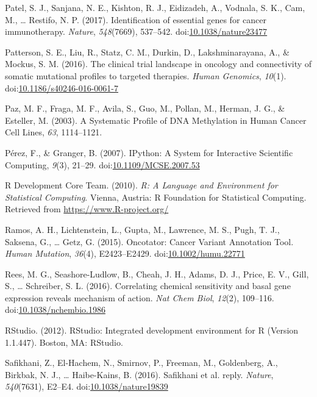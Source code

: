 \documentclass[man,floatsintext]{apa6}
\begin{document}
\hypertarget{ref-patel2017}{}
Patel, S. J., Sanjana, N. E., Kishton, R. J., Eidizadeh, A., Vodnala, S.
K., Cam, M., \ldots{} Restifo, N. P. (2017). Identification of essential
genes for cancer immunotherapy. \emph{Nature}, \emph{548}(7669),
537--542.
doi:\href{https://doi.org/10.1038/nature23477}{10.1038/nature23477}

\hypertarget{ref-patterson2016}{}
Patterson, S. E., Liu, R., Statz, C. M., Durkin, D., Lakshminarayana,
A., \& Mockus, S. M. (2016). The clinical trial landscape in oncology
and connectivity of somatic mutational profiles to targeted therapies.
\emph{Human Genomics}, \emph{10}(1).
doi:\href{https://doi.org/10.1186/s40246-016-0061-7}{10.1186/s40246-016-0061-7}

\hypertarget{ref-paz2003}{}
Paz, M. F., Fraga, M. F., Avila, S., Guo, M., Pollan, M., Herman, J. G.,
\& Esteller, M. (2003). A Systematic Profile of DNA Methylation in Human
Cancer Cell Lines, \emph{63}, 1114--1121.

\hypertarget{ref-perez2007}{}
Pérez, F., \& Granger, B. (2007). IPython: A System for Interactive
Scientific Computing, \emph{9}(3), 21--29.
doi:\href{https://doi.org/10.1109/MCSE.2007.53}{10.1109/MCSE.2007.53}

\hypertarget{ref-rdevelopmentcoreteam2010}{}
R Development Core Team. (2010). \emph{R: A Language and Environment for
Statistical Computing}. Vienna, Austria: R Foundation for Statistical
Computing. Retrieved from \url{https://www.R-project.org/}

\hypertarget{ref-ramos2015a}{}
Ramos, A. H., Lichtenstein, L., Gupta, M., Lawrence, M. S., Pugh, T. J.,
Saksena, G., \ldots{} Getz, G. (2015). Oncotator: Cancer Variant
Annotation Tool. \emph{Human Mutation}, \emph{36}(4), E2423--E2429.
doi:\href{https://doi.org/10.1002/humu.22771}{10.1002/humu.22771}

\hypertarget{ref-rees2016}{}
Rees, M. G., Seashore-Ludlow, B., Cheah, J. H., Adams, D. J., Price, E.
V., Gill, S., \ldots{} Schreiber, S. L. (2016). Correlating chemical
sensitivity and basal gene expression reveals mechanism of action.
\emph{Nat Chem Biol}, \emph{12}(2), 109--116.
doi:\href{https://doi.org/10.1038/nchembio.1986}{10.1038/nchembio.1986}

\hypertarget{ref-rstudio2012}{}
RStudio. (2012). RStudio: Integrated development environment for R
(Version 1.1.447). Boston, MA: RStudio.

\hypertarget{ref-safikhani2016}{}
Safikhani, Z., El-Hachem, N., Smirnov, P., Freeman, M., Goldenberg, A.,
Birkbak, N. J., \ldots{} Haibe-Kains, B. (2016). Safikhani et al. reply.
\emph{Nature}, \emph{540}(7631), E2--E4.
doi:\href{https://doi.org/10.1038/nature19839}{10.1038/nature19839}
\end{document}
